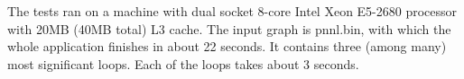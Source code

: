 The tests ran on a machine with dual socket 8-core Intel Xeon E5-2680 processor with 20MB (40MB total) L3 cache.
The input graph is pnnl.bin, with which the whole application finishes in about 22 seconds.
It contains three (among many) most significant loops. Each of the loops takes about 3 seconds. 


